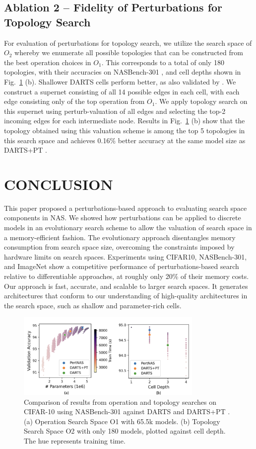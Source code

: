 \documentclass[onecolumn]{IEEEtran}
\begin{document}
\subsection{Ablation 2 – Fidelity of Perturbations for Topology Search}
For evaluation of perturbations for topology search, we utilize the search space of \( O_2 \) whereby we enumerate all possible topologies that can be constructed from the best operation choices in \( O_1 \). This corresponds to a total of only 180 topologies, with their accuracies on NASBench-301 \cite{Siems2020}, and cell depths shown in Fig.~\ref{fig:search_comparison} (b). Shallower DARTS cells perform better, as also validated by \cite{Siems2020}. We construct a supernet consisting of all 14 possible edges in each cell, with each edge consisting only of the top operation from \( O_1 \). We apply topology search on this supernet using perturb-valuation of all edges and selecting the top-2 incoming edges for each intermediate node. Results in Fig.~\ref{fig:search_comparison} (b) show that the topology obtained using this valuation scheme is among the top 5 topologies in this search space and achieves 0.16\% better accuracy at the same model size as DARTS+PT \cite{Wang2021}.

\section{CONCLUSION}
This paper proposed a perturbations-based approach to evaluating search space components in NAS. We showed how perturbations can be applied to discrete models in an evolutionary search scheme to allow the valuation of search space in a memory-efficient fashion. The evolutionary approach disentangles memory consumption from search space size, overcoming the constraints imposed by hardware limits on search spaces. Experiments using CIFAR10, NASBench-301, and ImageNet show a competitive performance of perturbations-based search relative to differentiable approaches, at roughly only 20\% of their memory costs. Our approach is fast, accurate, and scalable to larger search spaces. It generates architectures that conform to our understanding of high-quality architectures in the search space, such as shallow and parameter-rich cells.

\begin{figure}[ht]
	\centering
	\includegraphics[width=0.8\textwidth]{Figure-6.png}
	\caption{Comparison of results from operation and topology searches on CIFAR-10 using NASBench-301 against DARTS \cite{Liu2018} and DARTS+PT \cite{Wang2021}. (a) Operation Search Space O1 with 65.5k models. (b) Topology Search Space O2 with only 180 models, plotted against cell depth. The hue represents training time.}
	\label{fig:search_comparison}
\end{figure}
\end{document}
